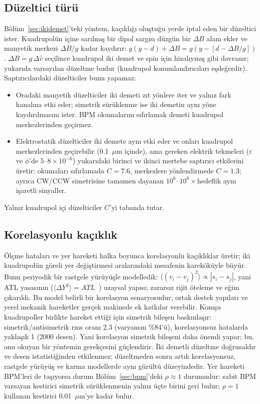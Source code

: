\documentclass[12pt,a4paper]{extarticle}
\begin{document}
\subsection{Düzeltici türü}\label{sec:duzeltici}
Bölüm~\ref{sec:ikidemet}'teki yöntem, kaçıklığı oluştuğu yerde iptal eden bir düzeltici ister. Kuadrupolün
içine sarılmış bir dipol sargısı düzgün bir $\Delta B$ alanı ekler ve manyetik merkezi $\Delta B/g$ kadar
kaydırır: $g(y-d)+\Delta B=g(y-[d-\Delta B/g])$. $\Delta B=g\,\Delta\hat v$ seçilince kuadrupol iki demet ve spin
için hizalıymış gibi davranır; yukarıda varsayılan düzeltme budur (kuadrupol konumlandırıcıları eşdeğerdir).
Saptırıcılardaki düzelticiler bunu yapamaz:
\begin{itemize}
\item Oradaki manyetik düzelticiler iki demeti zıt yönlere iter ve yalnız fark kanalına etki eder; simetrik
sürüklenme ise iki demetin aynı yöne kaydırılmasını ister. BPM okumalarını sıfırlamak demeti kuadrupol
merkezlerinden geçirmez.
\item Elektrostatik düzelticiler iki demete aynı etki eder ve onları kuadrupol merkezlerinden geçirebilir
(0.1~$\mu$m içinde), ama gereken elektrik tekmeleri ($\varepsilon$ ve $\phi$'de $5$--$8\times10^{-6}$) yukarıdaki
birinci ve ikinci mertebe saptırıcı etkilerini üretir: okumaları sıfırlamada $C=7.6$, merkezlere yönlendirmede
$C=1.3$; ayrıca CW/CCW simetrisine tamamen dayanan $10^6$--$10^8\times$hedeflik aynı işaretli sinyaller.
\end{itemize}
Yalnız kuadrupol içi düzelticiler $C$'yi tabanda tutar.

\subsection{Korelasyonlu kaçıklık}
Ölçme hataları ve yer hareketi halka boyunca korelasyonlu kaçıklıklar üretir; iki kuadrupolün göreli yer
değiştirmesi aralarındaki mesafenin kareköküyle büyür. Bunu periyodik bir rastgele yürüyüşle modelledik:
$\langle(v_i-v_j)^2\rangle\propto|s_i-s_j|$, yani ATL yasasının ($\langle\Delta Y^2\rangle=ATL$~\cite{shiltsev})
uzaysal yapısı; zararsız rijit öteleme ve eğim çıkarıldı. Bu model belirli bir korelasyon senaryosudur; ortak
destek yapıları ve yerel mekanik hareketler gerçek makinede ek katkılar verebilir. Komşu kuadrupoller birlikte
hareket ettiği için simetrik bileşen baskınlaşır: simetrik/antisimetrik rms oranı 2.3 (varyansın \%84'ü),
korelasyonsuz hatalarda yaklaşık 1 (2000 desen). Yani korelasyon simetrik bileşeni daha önemli yapar; bu, onu
okuyan bir yöntemin gerekçesini güçlendirir. İki demetli düzeltme doğrusaldır ve desen istatistiğinden
etkilenmez: düzeltmeden sonra artık korelasyonsuz, rastgele yürüyüş ve karma modellerde aynı gürültü
düzeyindedir. Yer hareketi BPM'leri de taşıyorsa durum Bölüm~\ref{sec:bpm}'deki $\rho\approx1$ durumudur: sabit
BPM varsayan kestirici simetrik sürüklenmenin yalnız üçte birini geri bulur; $\rho=1$ kullanan kestirici
0.01~$\mu$m'ye kadar bulur.
\end{document}
